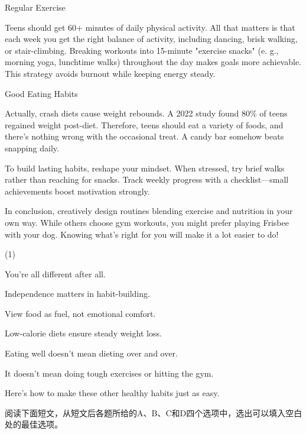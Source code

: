 \documentclass{英语试卷}
\begin{document}
\par Regular Exercise\par
\par Teens should get 60+ minutes of daily physical activity.  All that matters is that each week you get the right balance of activity, including dancing, brisk walking, or stair-climbing. Breaking workouts into 15-minute "exercise snacks" (e. g., morning yoga, lunchtime walks) throughout the day makes goals more achievable. This strategy avoids burnout while keeping energy steady.\par
\par Good Eating Habits\par
\par {} Actually, crash diets cause weight rebounds. A 2022 study found 80\% of teens regained weight post-diet. Therefore, teens should eat a variety of foods, and there's nothing wrong with the occasional treat. A candy bar somehow beats snapping daily.\par
\par To build lasting habits, reshape your mindset.  When stressed, try brief walks rather than reaching for snacks. Track weekly progress with a checklist—small achievements boost motivation strongly.\par
\par In conclusion, creatively design routines blending exercise and nutrition in your own way.  While others choose gym workouts, you might prefer playing Frisbee with your dog. Knowing what's right for you will make it a lot easier to do!\par
\begin{choices}(1)
  \item You're all different after all.
  \item Independence matters in habit-building.
  \item View food as fuel, not emotional comfort.
  \item Low-calorie diets ensure steady weight loss.
  \item Eating well doesn't mean dieting over and over.
  \item It doesn't mean doing tough exercises or hitting the gym.
  \item Here's how to make these other healthy habits just as easy.
\end{choices}
\par 阅读下面短文，从短文后各题所给的A、B、C和D四个选项中，选出可以填入空白处的最佳选项。\par
\end{document}
